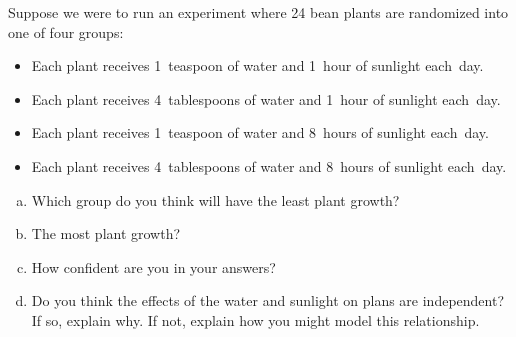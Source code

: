 






\pagebreak

\begin{exercise}
Suppose we were to run an experiment where 24 bean plants are randomized into one of four groups:
\begin{itemize}
\setlength{\itemsep}{0mm}
\item Each plant receives 1~teaspoon of water and 1~hour of sunlight each~day.
\item Each plant receives 4~tablespoons of water and 1~hour of sunlight each~day.
\item Each plant receives 1~teaspoon of water and 8~hours of sunlight each~day.
\item Each plant receives 4~tablespoons of water and 8~hours of sunlight each~day.
\end{itemize}
\begin{enumerate}[(a)]
\item Which group do you think will have the least plant growth?
\item The most plant growth?
\item How confident are you in your answers?
\item Do you think the effects of the water and sunlight on plans are independent? If so, explain why. If not, explain how you might model this relationship.
\end{enumerate}
\end{exercise}













































